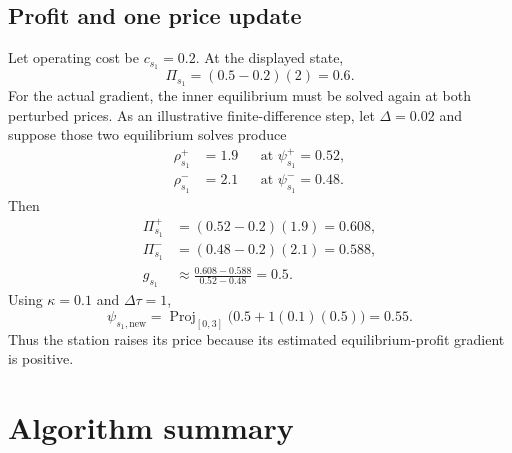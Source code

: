 \documentclass[11pt]{article}
\newcommand{\proj}{\operatorname{Proj}}
\begin{document}
\subsection*{Profit and one price update}

Let operating cost be $c_{s_1}=0.2$. At the displayed state,
\begin{equation}
    \Pi_{s_1}=(0.5-0.2)(2)=0.6.
\end{equation}
For the actual gradient, the inner equilibrium must be solved again at both
perturbed prices. As an illustrative finite-difference step, let $\Delta=0.02$
and suppose those two equilibrium solves produce
\begin{align}
    \rho_{s_1}^{+}&=1.9 &&\text{at }\psi_{s_1}^{+}=0.52,\\
    \rho_{s_1}^{-}&=2.1 &&\text{at }\psi_{s_1}^{-}=0.48.
\end{align}
Then
\begin{align}
    \Pi_{s_1}^{+}&=(0.52-0.2)(1.9)=0.608,\\
    \Pi_{s_1}^{-}&=(0.48-0.2)(2.1)=0.588,\\
    g_{s_1}&\approx\frac{0.608-0.588}{0.52-0.48}=0.5.
\end{align}
Using $\kappa=0.1$ and $\Delta\tau=1$,
\begin{equation}
    \psi_{s_1,\mathrm{new}}
    =\proj_{[0,3]}\bigl(0.5+1(0.1)(0.5)\bigr)
    =0.55.
\end{equation}
Thus the station raises its price because its estimated equilibrium-profit
gradient is positive.

\section{Algorithm summary}
\end{document}
